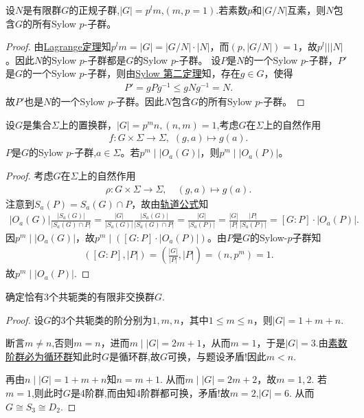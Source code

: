 \documentclass[../../main.tex]{subfiles}%
\begin{document}
\begin{example}
设$N$是有限群$G$的正规子群,$|G|=p^lm$,$(m,p=1)$.若素数$p$和$|G/N|$互素，则$N$包含$G$的所有Sylow $p$-子群。
\end{example}
\begin{proof}
由\hyperref[theorem:抽象代数--Lagrange定理]{Lagrange定理}知$p^lm=|G|=|G/N|\cdot|N|$，而$(p,|G/N|)=1$，故$p^l || |N|$。因此$N$的Sylow $p$-子群都是$G$的Sylow $p$-子群。
设$P$是$N$的一个Sylow $p$-子群，$P'$是$G$的一个Sylow $p$-子群，则由\hyperref[theorem:Sylow 第二定理]{Sylow 第二定理}知，存在$g\in G$，使得
\begin{align*}
P' = gPg^{-1} \leqslant gNg^{-1} = N.
\end{align*}
故$P'$也是$N$的一个Sylow $p$-子群。因此$N$包含$G$的所有Sylow $p$-子群。
\end{proof}

\begin{example}
设$G$是集合$\Sigma$上的置换群，$|G|=p^mn,(n,m)=1$,考虑$G$在$\Sigma$上的自然作用
\begin{align*}
f:G\times \Sigma \to \Sigma,\,\,(g,a)\mapsto g(a).
\end{align*}
$P$是$G$的Sylow $p$-子群,$a\in\Sigma$。若$p^m\mid |O_a(G)|$，则$p^m\mid |O_a(P)|$。
\end{example}
\begin{proof}
考虑$G$在$\Sigma$上的自然作用
\begin{align*}
\rho: G\times \Sigma \rightarrow \Sigma ,\quad (g,a) \mapsto g(a).
\end{align*}
注意到$S_a(P)=S_a(G)\cap P$，故由\hyperref[corollary:有限群轨道的阶与其商掉迷向子群的阶相同]{轨道公式}知
\begin{align*}
|O_a(G)|\frac{|S_a(G)|}{|S_a(G)\cap P|}=\frac{|G|}{|S_a(G)|}\frac{|S_a(G)|}{|S_a(G)\cap P|}=\frac{|G|}{|S_a(P)|}=\frac{|G|}{|P|}\frac{|P|}{|S_a(P)|}=[G:P]\cdot |O_a(P)|.
\end{align*}
因$p^m\mid |O_a(G)|$，故$p^m\mid ([G:P]\cdot |O_a(P)|)$。由$P$是$G$的Sylow-$p$子群知
\begin{align*}
([G:P],|P|)=\left(\frac{|G|}{|P|},|P|\right)=(n,p^m)=1.
\end{align*}
故$p^m\mid |O_a(P)|$.
\end{proof}

\begin{example}
确定恰有3个共轭类的有限非交换群$G$.
\end{example}
\begin{proof}
设$G$的3个共轭类的阶分别为$1,m,n$，其中$1\leqslant m\leqslant n$，则$|G|=1+m+n$.

断言$m\neq n$,否则$m=n$，进而$m\mid |G|=2m+1$，从而$m=1$，于是$|G|=3$.由\hyperref[proposition:素数阶群必为循环群]{素数阶群必为循环群}知此时$G$是循环群,故$G$可换，与题设矛盾!因此$m<n$.

再由$n\mid |G|=1+m+n$知$n=m+1$. 从而$m\mid |G|=2m+2$，故$m=1,2$. 若$m=1$,则此时$G$是4阶群,而由知4阶群都可换，矛盾!故$m=2$,$|G|=6$. 从而$G\cong S_3\cong D_2$.
\end{proof}
\end{document}
